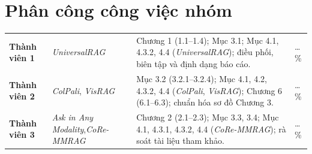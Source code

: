 
\chapter*{Phân công công việc nhóm}
{}


\begin{table}[H]
\centering
\small
\renewcommand{\arraystretch}{1.25}
\begin{tabularx}{\textwidth}{@{}P{2.8cm}P{3.3cm}L M{2.1cm}@{}}
\toprule
{}
 &  &  &  \\
\midrule
\textbf{Thành viên 1} &
\textit{UniversalRAG} &
Chương 1 (1.1--1.4); Mục 3.1; Mục 4.1, 4.3.2, 4.4 (\textit{UniversalRAG}); điều phối, biên tập và định dạng báo cáo. &
\dots\% \\
\midrule
\textbf{Thành viên 2} &
\textit{ColPali}, \textit{VisRAG} &
Mục 3.2 (3.2.1--3.2.4); Mục 4.1, 4.2, 4.3.2, 4.4 (\textit{ColPali}, \textit{VisRAG}); Chương 6 (6.1--6.3); chuẩn hóa sơ đồ Chương 3. &
\dots\% \\
\midrule
\textbf{Thành viên 3} &
\textit{Ask in Any Modality},\newline \textit{CoRe-MMRAG} &
Chương 2 (2.1--2.3); Mục 3.3, 3.4; Mục 4.1, 4.3.1, 4.3.2, 4.4 (\textit{CoRe-MMRAG}); rà soát tài liệu tham khảo. &
\dots\% \\
\bottomrule
\end{tabularx}
\end{table}
